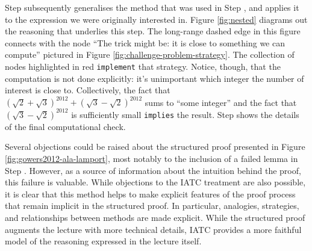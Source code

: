 \documentclass[smallextended,oneside]{svjour3}       %
\newcommand\nothing[1]{#1}
\let\paragraph\nothing
\begin{document}
Step  subsequently generalises the
method that was used in Step , and applies it to the
expression we were originally interested in.
Figure \ref{fig:nested} diagrams out the reasoning that underlies this step.
The long-range dashed edge in this figure connects with the
node ``The trick might be: it is close to something we can compute''
pictured in Figure \ref{fig:challenge-problem-strategy}.
The
collection of nodes highlighted in red \texttt{implement} that
strategy.  Notice, though, that the computation is not done explicitly:
it's unimportant which integer the number of interest is close to.
Collectively, the fact that
$(\sqrt{2}+\sqrt{3})^{2012}+(\sqrt{3}-\sqrt{2})^{2012}$
sums to ``some integer'' and the fact that $(\sqrt{3}-\sqrt{2})^{2012}$
is sufficiently small \texttt{implies} the result.
Step  shows the details of the final computational check.

\paragraph{Several objections could be raised about the structured proof presented in Figure \ref{fig:gowers2012-ala-lamport}, most notably to the inclusion of a failed lemma in Step \pfref{2}.}
However, as a source of information about the intuition behind the
proof, this failure is valuable.  While objections to the IATC treatment 
are also possible, it is clear that this method helps to 
make explicit features of the proof process that remain implicit in the
structured proof.  In particular,
analogies, strategies, and relationships between methods are
made explicit.  While the structured proof augments the lecture with
more technical details, IATC provides a more faithful model of the reasoning
expressed in the lecture itself.
\end{document}
